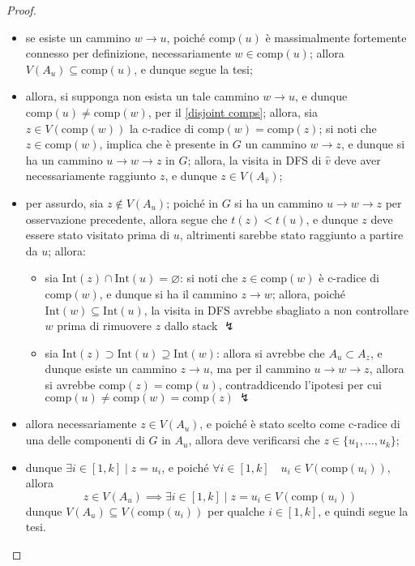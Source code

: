 \documentclass[a4paper, 12pt]{report}
\begin{document}
\begin{proof}
\begin{enumerate}[label=\roman*), font=\itshape]
                \begin{itemize}
                    \item se esiste un cammino $w \rightarrow u$, poiché $\mathrm{comp}(u)$ è massimalmente fortemente connesso per definizione, necessariamente $w \in \mathrm{comp}(u)$; allora $V(A_u) \subseteq \mathrm{comp}(u)$, e dunque segue la tesi;
                    \item allora, si supponga non esista un tale cammino $w \rightarrow u$, e dunque $\mathrm{comp}(u) \neq \mathrm{comp}(w)$, per il \cref{disjoint comps}; allora, sia $z \in V(\mathrm{comp}(w))$ la c-radice di $\mathrm{comp}(w) = \mathrm{comp}(z)$; si noti che $z \in \mathrm{comp}(w)$, implica che è presente in $G$ un cammino $w \rightarrow z$, e dunque si ha un cammino $u \rightarrow w \rightarrow z$ in $G$; allora, la visita in DFS di $\hat v$ deve aver necessariamente raggiunto $z$, e dunque $z \in V(A_{\hat v})$;
                    \item per assurdo, sia $z \notin V(A_u)$; poiché in $G$ si ha un cammino $u \rightarrow w \rightarrow z$ per osservazione precedente, allora segue che $t(z) < t(u)$, e dunque $z$ deve essere stato visitato prima di $u$, altrimenti sarebbe stato raggiunto a partire da $u$; allora:
                    \begin{itemize}
                        \item sia $\mathrm{Int}(z) \cap \mathrm{Int}(u) = \varnothing$: si noti che $z \in \mathrm{comp}(w)$ è c-radice di $\mathrm{comp}(w)$, e dunque si ha il cammino $z \rightarrow w$; allora, poiché $\mathrm{Int}(w) \subseteq \mathrm{Int}(u)$, la visita in DFS avrebbe sbagliato a non controllare $w$ prima di rimuovere $z$ dallo stack $\lightning$
                        \item sia $\mathrm{Int}(z) \supset \mathrm{Int}(u) \supseteq \mathrm{Int}(w)$: allora si avrebbe che $A_u \subset A_z$, e dunque esiste un cammino $z \rightarrow u$, ma per il cammino $u \rightarrow w \rightarrow z$, allora si avrebbe $\mathrm{comp}(z) = \mathrm{comp}(u)$, contraddicendo l'ipotesi per cui $\mathrm{comp}(u) \neq \mathrm{comp}(w) = \mathrm{comp}(z) \ \lightning$
                    \end{itemize}
                \item allora necessariamente $z \in V(A_u)$, e poiché è stato scelto come c-radice di una delle componenti di $G$ in $A_u$, allora deve verificarsi che $z \in \{u_1, \ldots, u_k\}$;
                \item dunque $\exists i \in [1, k] \mid z= u_i$, e poiché $\forall i \in [1, k] \quad u_i \in V(\mathrm{comp}(u_i))$, allora $$z \in V(A_u) \implies \exists i \in [1, k] \mid z = u_i \in V(\mathrm{comp}(u_i))$$ dunque $V(A_u) \subseteq V(\mathrm{comp}(u_i))$ per qualche $i \in [1, k]$, e quindi segue la tesi.
                \end{itemize}
        \end{enumerate}
    \end{proof}
\end{document}
